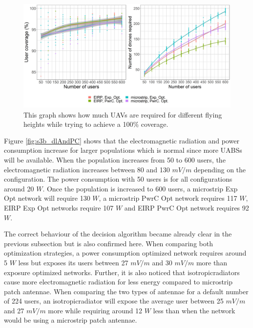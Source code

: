 \documentclass[twocolumn]{phdsymp} %
\begin{document}
\begin{figure}[h]
  \includegraphics[width=\linewidth]{../results/s3/uvsnumdronesAndCov.png}
  \caption{This graph shows how much \acs{UAV}s are required for different flying heights while trying to achieve a 100\% coverage.}
  \label{fig:s3b_numdronesAndCov}
\end{figure}


Figure \ref{fig:s3b_dlAndPC} shows that the electromagnetic radiation and power consumption increase for larger 
populations which is normal since more \gls{UABS}s will be available.
When the population increases from 50 to 600 users, the electromagnetic radiation increases 
between 80 and 130 $mV/m$ depending on the configuration. The power consumption with 50 users is for all configurations around 
20 $W$. Once the population is increased to 600 users, a microstrip \gls{Exp Opt} network will require 130 $W$, 
 a microstrip \gls{PwrC Opt} network requires 117 $W$,
\gls{EIRP} \gls{Exp Opt} networks require 107 $W$ and \gls{EIRP} \gls{PwrC Opt} network requires 92 $W$.

The correct behaviour of the decision algorithm became already clear in the previous subsection but is also
confirmed here. 
When comparing both optimization strategies, a power consumption optimized network requires around 5 $W$ less but exposes its users between 27 $mV/m$ and 30 $mV/m$ more than
exposure optimized networks. 
Further, it is also noticed that \gls{isotropicradiator}s cause more electromagnetic radiation for less energy
compared to microstrip patch antennae. 
When comparing the two types of antennae for a default number of 224 users, 
an \gls{isotropicradiator} will expose the average user 
between 25 $mV/m$ and 27 $mV/m$ more while requiring around 12 $W$ less than when the network would be using a microstrip patch antennae.
\end{document}
